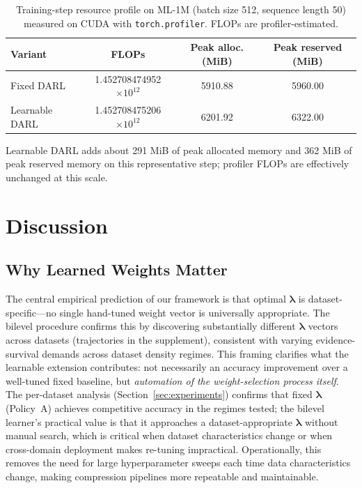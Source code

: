 \documentclass[lettersize,journal]{IEEEtran}
\newcommand{\lambdavec}{\boldsymbol{\lambda}}
\begin{document}
\begin{table}[t]
\centering
\caption{Training-step resource profile on ML-1M (batch size 512, sequence length 50)
measured on CUDA with \texttt{torch.profiler}. FLOPs are profiler-estimated.}
\label{tab:resource_profile}
\setlength{\tabcolsep}{4pt}
\begin{tabular}{lccc}
\toprule
Variant & FLOPs & Peak alloc. (MiB) & Peak reserved (MiB) \\
\midrule
Fixed DARL & 1.452708474952$\times 10^{12}$ & 5910.88 & 5960.00 \\
Learnable DARL & 1.452708475206$\times 10^{12}$ & 6201.92 & 6322.00 \\
\bottomrule
\end{tabular}
\vspace{0.5em}

\footnotesize{Learnable DARL adds about 291 MiB of peak allocated memory
and 362 MiB of peak reserved memory on this representative step; profiler FLOPs
are effectively unchanged at this scale.}
\end{table}


\section{Discussion}
\label{sec:discussion}

\subsection{Why Learned Weights Matter}
The central empirical prediction of our framework is that optimal
$\lambdavec$ is dataset-specific---no single hand-tuned weight vector
is universally appropriate.
The bilevel procedure confirms this by discovering substantially
different $\lambdavec$ vectors across datasets (trajectories in the
supplement), consistent with varying evidence-survival demands across
dataset density regimes.
This framing clarifies what the learnable extension contributes:
not necessarily an accuracy improvement over a well-tuned fixed baseline,
but \emph{automation of the weight-selection process itself}.
The per-dataset analysis (Section~\ref{sec:experiments}) confirms that
fixed $\lambdavec$ (Policy~A) achieves competitive accuracy in the
regimes tested; the bilevel learner's practical value is that it
approaches a dataset-appropriate $\lambdavec$ without manual search,
which is critical when dataset characteristics change or when
cross-domain deployment makes re-tuning impractical.
Operationally, this removes the need for large hyperparameter sweeps
each time data characteristics change, making compression pipelines
more repeatable and maintainable.
\end{document}
